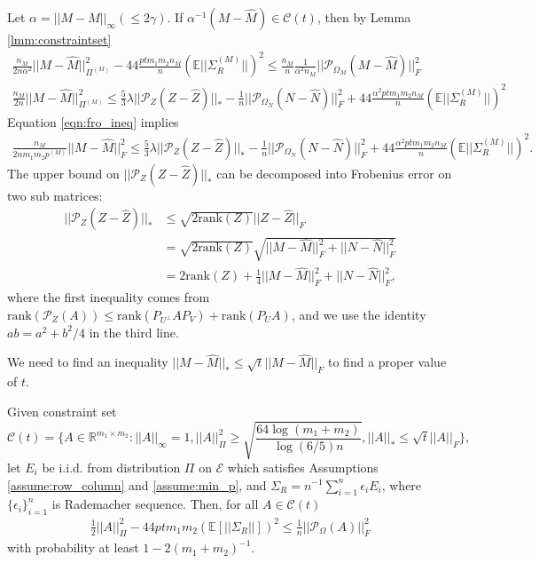 \documentclass{article} %
\newcommand\mc{\mathcal} %
\begin{document}
Let $\alpha = ||M - \hat{M}||_\infty (\leq 2\gamma)$. If $\alpha^{-1}(M-\hat{M}) \in \mc{C}(t)$, then by Lemma \ref{lmm:constraintset}
\begin{align}
\frac{n_M}{2n\alpha^2}||M-\hat{M}||_{\Pi^{(M)}}^2  - 44 \frac{ptm_1m_2n_M}{n}(\mathbb{E}||\Sigma_R^{(M)}||)^2 
\leq \frac{n_M}{n}\frac{1}{\alpha^2n_M}||\mc{P}_{\Omega_M}(M-\hat{M})||_F^2 \\
\frac{n_M}{2n}||M-\hat{M}||_{\Pi^{(M)}}^2  \leq \frac{5}{3}\lambda ||\mc{P}_Z(Z-\hat{Z})||_* - \frac{1}{n}||\mc{P}_{\Omega_N}(N-\hat{N})||_F^2 + 44 \frac{\alpha^2 ptm_1m_2n_M}{n}(\mathbb{E}||\Sigma_R^{(M)}||)^2
\end{align}
Equation \ref{eqn:fro_ineq} implies
\begin{align}
\frac{n_M}{2nm_1m_2p^{(M)}}||M-\hat{M}||_F^2  \leq \frac{5}{3}\lambda ||\mc{P}_Z(Z-\hat{Z})||_* - \frac{1}{n}||\mc{P}_{\Omega_N}(N-\hat{N})||_F^2 + 44 \frac{\alpha^2 ptm_1m_2n_M}{n}(\mathbb{E}||\Sigma_R^{(M)}||)^2.
\end{align}
The upper bound on $||\mc{P}_Z(Z-\hat{Z})||_*$ can be decomposed into Frobenius error on two sub matrices:
\begin{align}
||\mc{P}_Z(Z-\hat{Z})||_* & \leq \sqrt{2\text{rank}(Z)}||Z-\hat{Z}||_F \\
& =  \sqrt{2\text{rank}(Z)} \sqrt{||M-\hat{M}||_F^2 + ||N-\hat{N}||_F^2}\\
& = 2\text{rank}(Z) + \frac{1}{4}||M-\hat{M}||_F^2 + ||N-\hat{N}||_F^2,
\end{align}
where the first inequality comes from $\text{rank}(\mc{P}_Z(A)) \leq \text{rank}(P_{U^\perp}AP_V) + \text{rank}(P_{U}A)$, and we use the identity $ab = a^2 + b^2/4$ in the third line.

We need to find an inequality $||M-\hat{M}||_* \leq \sqrt{t}||M-\hat{M}||_F$ to find a proper value of $t$.

\begin{lemma} \label{lmm:constraintset} Given constraint set
\begin{equation}
\mc{C}(t) = \bigg\{ A \in \mathbb{R}^{m_1 \times m_2}: ||A||_\infty = 1, ||A||_\Pi^2 \geq \sqrt{\frac{64\log(m_1+m_2)}{\log(6/5)n}}, ||A||_* \leq \sqrt{t}||A||_F \bigg\},
\end{equation}
let $E_i$ be i.i.d. from distribution $\Pi$ on $\mc{E}$ which satisfies Assumptions \ref{assume:row_column} and \ref{assume:min_p}, and $\Sigma_R = n^{-1}\sum_{i=1}^{n}\epsilon_i E_i$, where $\{\epsilon_i\}_{i=1}^{n}$ is Rademacher sequence. Then, for all $A\in \mc{C}(t)$
\begin{align}
\frac{1}{2}||A||_\Pi^2  - 44 ptm_1m_2(\mathbb{E}[||\Sigma_R||])^2 \leq \frac{1}{n}||\mc{P}_{\Omega}(A)||_F^2
\end{align}
with probability at least $1-2(m_1+m_2)^{-1}$.
\end{lemma}
\end{document}
